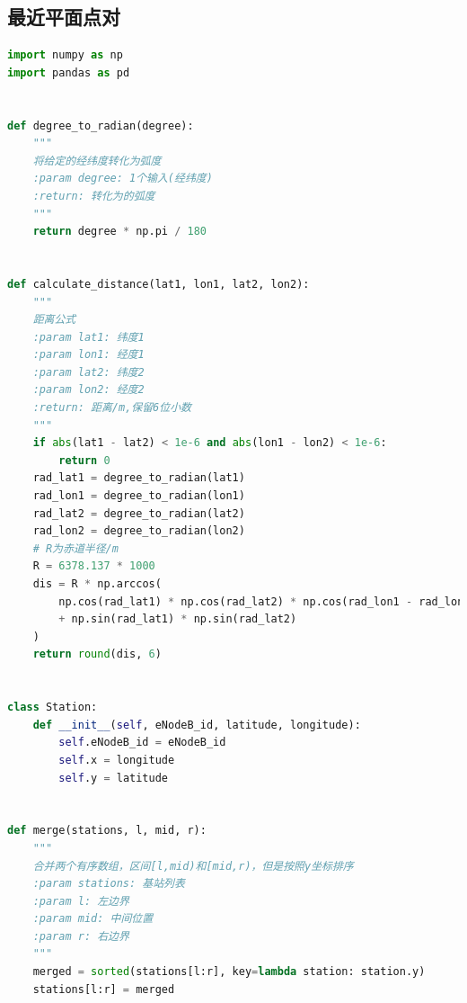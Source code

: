 \documentclass[lang=cn,11pt,a4paper]{elegantpaper}
\begin{document}
\subsection{最近平面点对}
\begin{lstlisting}[language=python]
import numpy as np
import pandas as pd


def degree_to_radian(degree):
    """
    将给定的经纬度转化为弧度
    :param degree: 1个输入(经纬度)
    :return: 转化为的弧度
    """
    return degree * np.pi / 180


def calculate_distance(lat1, lon1, lat2, lon2):
    """
    距离公式
    :param lat1: 纬度1
    :param lon1: 经度1
    :param lat2: 纬度2
    :param lon2: 经度2
    :return: 距离/m,保留6位小数
    """
    if abs(lat1 - lat2) < 1e-6 and abs(lon1 - lon2) < 1e-6:
        return 0
    rad_lat1 = degree_to_radian(lat1)
    rad_lon1 = degree_to_radian(lon1)
    rad_lat2 = degree_to_radian(lat2)
    rad_lon2 = degree_to_radian(lon2)
    # R为赤道半径/m
    R = 6378.137 * 1000
    dis = R * np.arccos(
        np.cos(rad_lat1) * np.cos(rad_lat2) * np.cos(rad_lon1 - rad_lon2)
        + np.sin(rad_lat1) * np.sin(rad_lat2)
    )
    return round(dis, 6)


class Station:
    def __init__(self, eNodeB_id, latitude, longitude):
        self.eNodeB_id = eNodeB_id
        self.x = longitude
        self.y = latitude


def merge(stations, l, mid, r):
    """
    合并两个有序数组，区间[l,mid)和[mid,r)，但是按照y坐标排序
    :param stations: 基站列表
    :param l: 左边界
    :param mid: 中间位置
    :param r: 右边界
    """
    merged = sorted(stations[l:r], key=lambda station: station.y)
    stations[l:r] = merged



\end{lstlisting}
\end{document}
